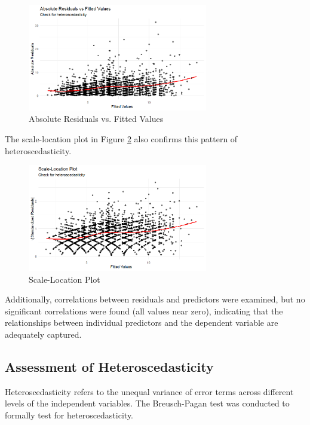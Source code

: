 \documentclass[12pt]{article}
\begin{document}
\begin{figure}[H]
\centering
\includegraphics[width=0.7\textwidth]{media/Absolute_Residuals_vs_Fitted.png}
\caption{Absolute Residuals vs. Fitted Values}
\label{fig:abs_resid}
\end{figure}

The scale-location plot in Figure \ref{fig:scale_location} also confirms this pattern of heteroscedasticity.

\begin{figure}[H]
\centering
\includegraphics[width=0.7\textwidth]{media/Scale-Location Plot.png}
\caption{Scale-Location Plot}
\label{fig:scale_location}
\end{figure}

Additionally, correlations between residuals and predictors were examined, but no significant correlations were found (all values near zero), indicating that the relationships between individual predictors and the dependent variable are adequately captured.


\subsection{Assessment of Heteroscedasticity}

Heteroscedasticity refers to the unequal variance of error terms across different levels of the independent variables. The Breusch-Pagan test was conducted to formally test for heteroscedasticity.
\end{document}
